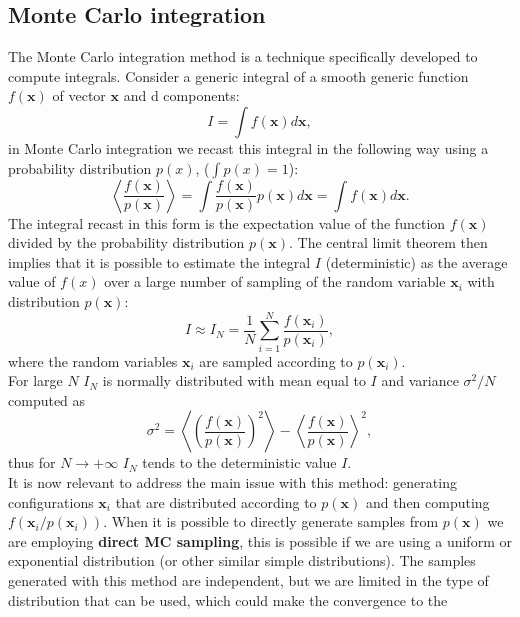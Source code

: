 \subsection{Monte Carlo integration}
The Monte Carlo integration method is a technique specifically developed to compute integrals. Consider a generic integral of a smooth generic function 
$f(\mathbf{x})$ of vector $\mathbf{x}$ and d components:
\begin{equation}
    I=\int f(\mathbf{x})d\mathbf{x},
\end{equation}
in Monte Carlo integration we recast this integral in the following way using a probability distribution $p(x)$, ($\int p(x)=1$):
\begin{equation}
    \left\langle \frac{f(\mathbf{x})}{p(\mathbf{x})}\right\rangle =\int\frac{f(\mathbf{x})}{p(\mathbf{x})}p(\mathbf{x})d\mathbf{x} = \int f(\mathbf{x})d\mathbf{x}.
\end{equation}
The integral recast in this form is the expectation value of the function $f(\mathbf{x})$ divided by the probability distribution $p(\mathbf{x})$. 
The central limit theorem then implies that it is possible to estimate the integral $I$ (deterministic) as the average value of $f(x)$ over a large number of
sampling of the random variable $\mathbf{x}_i$ with distribution $p(\mathbf{x})$:
\begin{equation}
    I\approx I_N=\frac{1}{N}\sum_{i=1}^N\frac{f(\mathbf{x}_i)}{p(\mathbf{x}_i)},
\end{equation}
where the random variables $\mathbf{x}_i$ are sampled according to $p(\mathbf{x}_i)$.\\
For large $N$ $I_N$ is normally distributed with mean equal to $I$ and variance $\sigma^2/N$ computed as 
\begin{equation}
    \sigma^2=\left \langle \left(\frac{ f(\mathbf{x})}{p(\mathbf{x})}\right)^2  \right\rangle-\left\langle \frac{f(\mathbf{x})}{p(\mathbf{x})} \right\rangle^2,
\end{equation}
thus for $N\to+\infty$ $I_N$ tends to the deterministic value $I$.\\
It is now relevant to address the main issue with this method: generating configurations $\mathbf{x}_i$ that are distributed according to 
$p(\mathbf{x})$ and then computing $f(\mathbf{x}_i/p(\mathbf{x}_i))$. When it is possible to directly generate samples from $p(\mathbf{x})$ 
we are employing \textbf{direct MC sampling}, this is possible if we are using a uniform or exponential distribution (or other similar simple distributions).
The samples generated with this method are independent, but we are limited in the type of distribution that can be used, which could make the convergence to the 
